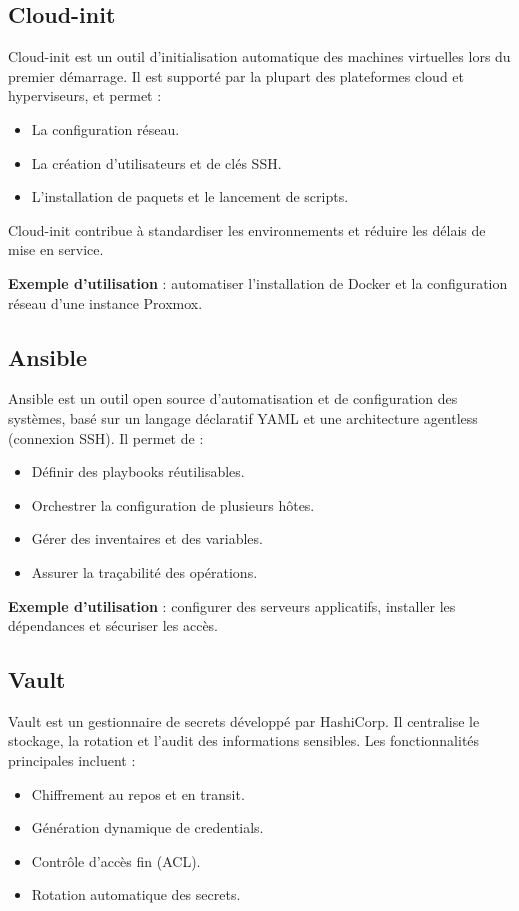 \subsection{Cloud-init}

Cloud-init est un outil d’initialisation automatique des machines virtuelles lors du premier démarrage. Il est supporté par la plupart des plateformes cloud et hyperviseurs, et permet :
\begin{itemize}
	\item La configuration réseau.
	\item La création d’utilisateurs et de clés SSH.
	\item L’installation de paquets et le lancement de scripts.
\end{itemize}

Cloud-init contribue à standardiser les environnements et réduire les délais de mise en service.

\textbf{Exemple d’utilisation} : automatiser l’installation de Docker et la configuration réseau d’une instance Proxmox.

\subsection{Ansible}

Ansible est un outil open source d’automatisation et de configuration des systèmes, basé sur un langage déclaratif YAML et une architecture agentless (connexion SSH). Il permet de :
\begin{itemize}
	\item Définir des playbooks réutilisables.
	\item Orchestrer la configuration de plusieurs hôtes.
	\item Gérer des inventaires et des variables.
	\item Assurer la traçabilité des opérations.
\end{itemize}

\textbf{Exemple d’utilisation} : configurer des serveurs applicatifs, installer les dépendances et sécuriser les accès.

\subsection{Vault}

Vault est un gestionnaire de secrets développé par HashiCorp. Il centralise le stockage, la rotation et l’audit des informations sensibles. Les fonctionnalités principales incluent :
\begin{itemize}
	\item Chiffrement au repos et en transit.
	\item Génération dynamique de credentials.
	\item Contrôle d’accès fin (ACL).
	\item Rotation automatique des secrets.
\end{itemize}

